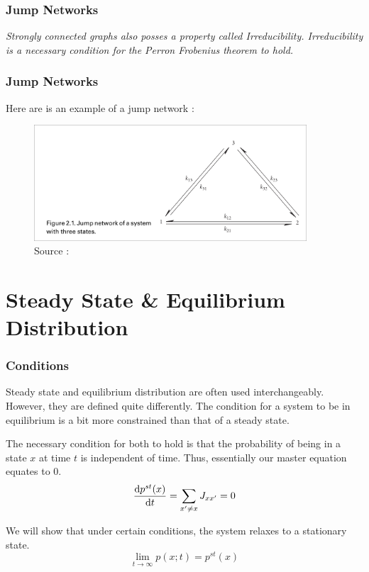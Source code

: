 \documentclass[9pt]{beamer}
\begin{document}
\begin{frame}
  \frametitle{Jump Networks}

  \emph{Strongly connected graphs also posses a property called Irreducibility. Irreducibility is a necessary condition for the Perron Frobenius theorem to hold.}
\end{frame}

\begin{frame}
  \frametitle{Jump Networks}
    Here are is an example of a jump network : 
  \begin{figure}
    \includegraphics[width = 4in]{jump network.png}
    \caption{Source : \cite{PelitiPigolotti2023}}
  \end{figure}
\end{frame}
\section{Steady State \& Equilibrium Distribution}

\begin{frame}
  \frametitle{Conditions}
  Steady state and equilibrium distribution are often used interchangeably. However, they are defined quite differently.
  The condition for a system to be in equilibrium is a bit more constrained than that of a steady state.
  
  The necessary condition for both to hold is that the probability of being in a state $x$ at time $t$ is independent of time.
  Thus, essentially our master equation equates to $0$.
  $$\dv{p^{st}(x)}{t} = \sum_{x' \neq x} J_{xx'} = 0$$

  We will show that under certain conditions, the system relaxes to a stationary state.
  $$\lim_{t \to \infty} p(x;t) = p^{st}(x)$$
\end{frame}
\end{document}
